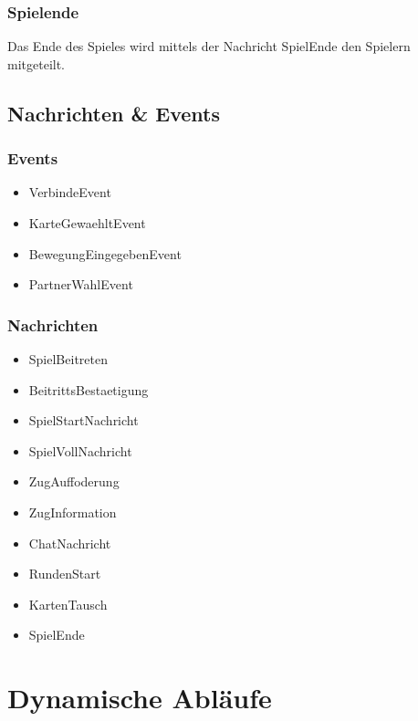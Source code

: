 \documentclass[12pt,halfparskip]{scrartcl}
\begin{document}
\subsubsection{Spielende} %
\label{ssub:spielende}
Das Ende des Spieles wird mittels der Nachricht SpielEnde den Spielern mitgeteilt.

\clearpage
\subsection{Nachrichten \& Events} %
\label{sub:nachrichten_und_events}


\subsubsection{Events} %
\label{ssub:events}

\begin{itemize}
	\item VerbindeEvent
	\item KarteGewaehltEvent
	\item BewegungEingegebenEvent
	\item PartnerWahlEvent
\end{itemize}


\subsubsection{Nachrichten} %
\label{ssub:nachrichten}

\begin{itemize}
	\item SpielBeitreten
	\item BeitrittsBestaetigung
	\item SpielStartNachricht
	\item SpielVollNachricht
	\item ZugAuffoderung
	\item ZugInformation
	\item ChatNachricht
	\item RundenStart
	\item KartenTausch
	\item SpielEnde
\end{itemize}

\clearpage
\section{Dynamische Abläufe} %
\label{dynamische_ablauefe}
\end{document}
